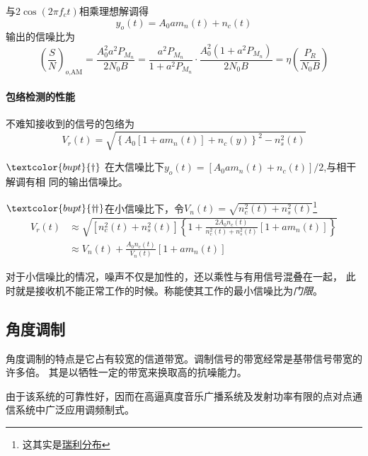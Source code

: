     与$2\cos(2\pi f_ct)$相乘理想解调得
    \begin{equation}
        y_o(t)=A_0am_n(t)+n_c(t)
    \end{equation}
    输出的信噪比为
    \begin{equation}
        \left(\frac{S}{N}\right)_{o\text{,AM}}=\frac{A_0^2a^2P_{M_n}}{2N_0B}=\frac{a^2P_{M_n}}{1+a^2P_{M_n}}\cdot\frac{A_0^2(1+a^2P_{M_n})}{2N_0B}=\eta\left(\frac{P_R}{N_0B}\right)
    \end{equation}

    \paragraph{包络检测的性能}\mbox{}

    不难知接收到的信号的包络为
    \begin{equation}
        V_r(t)=\sqrt{\left\{A_0[1+am_n(t)]+n_c(y)\right\}^2-n_s^2(t)}
    \end{equation}

    $\textcolor{bupt}{\dagger}$ 在大信噪比下$y_o(t)=[A_0am_n(t)+n_c(t)]/2$,与相干解调有相
    同的输出信噪比。

    $\textcolor{bupt}{\dagger\hspace{-0.1em}\dagger}$在小信噪比下，令$V_n(t)=\sqrt{n_c^2(t)+n_s^2(t)}$\footnote{这其实是\hyperref[eq:Rayleigh]{瑞利分布}}
    \begin{equation}
        \begin{split}
            V_r(t)  &\approx\sqrt{[n_c^2(t)+n_s^2(t)]\left\{1+\frac{2A_0n_c(t)}{n_c^2(t)+n_s^2(t)}[1+am_n(t)]\right\}}\\
                    &\approx V_n(t)+\frac{A_0n_c(t)}{V_n(t)}[1+am_n(t)]
        \end{split}
    \end{equation}

    对于小信噪比的情况，噪声不仅是加性的，还以乘性与有用信号混叠在一起，
    此时就是接收机不能正常工作的时候。称能使其工作的最小信噪比为\emph{门限}。

\subsection{角度调制}

    角度调制的特点是它占有较宽的信道带宽。调制信号的带宽经常是基带信号带宽的许多倍。
    其是以牺牲一定的带宽来换取高的抗噪能力。

    由于该系统的可靠性好，因而在高逼真度音乐广播系统及发射功率有限的点对点通信系统中广泛应用调频制式。


